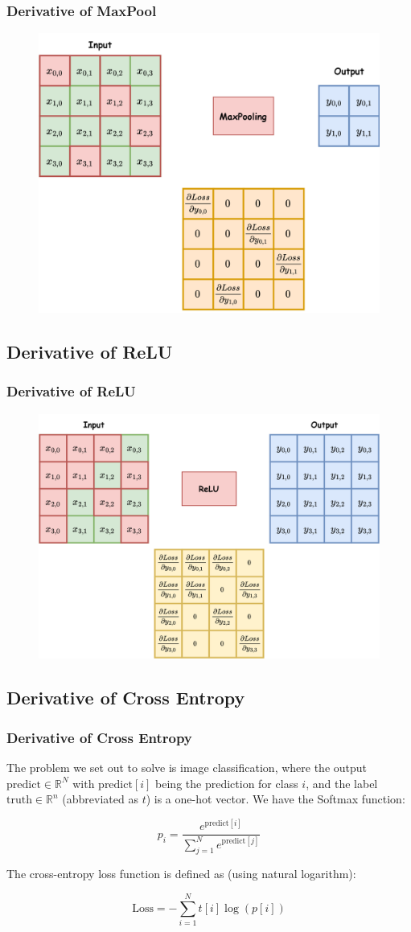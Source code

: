 \documentclass{beamer}
\begin{document}
    \begin{frame}
    	\frametitle{Derivative of MaxPool}
    	\begin{figure}
    		\includegraphics[width=0.6\linewidth]{"src/conv.drawio (4).png"}
    	\end{figure}
    \end{frame} 
  
    \subsection{Derivative of ReLU}  
    \begin{frame}
    	\frametitle{Derivative of ReLU}
    	\begin{figure}
    		\includegraphics[width=0.6\linewidth]{"src/conv.drawio (5).png"}
    	\end{figure}
    \end{frame} 
    
    \subsection{Derivative of Cross Entropy}
    
    \begin{frame}
    	\frametitle{Derivative of Cross Entropy}
    	\justifying
    	The problem we set out to solve is image classification, where the output \( \text{predict} \in \mathbb{R}^N \) with \( \text{predict}[i] \) being the prediction for class \( i \), and the label \( \text{truth} \in \mathbb{R}^n \) (abbreviated as \( t \)) is a one-hot vector. We have the Softmax function:
    	
    	\[
    	p_i = \frac{e^{\text{predict}[i]}}{\sum_{j=1}^{N} e^{\text{predict}[j]}} 
    	\]
    	
    	The cross-entropy loss function is defined as (using natural logarithm):
    	
    	\[
    	\text{Loss} = -\sum_{i=1}^N t[i] \log(p[i])
    	\]
    \end{frame}
    
\end{document}

